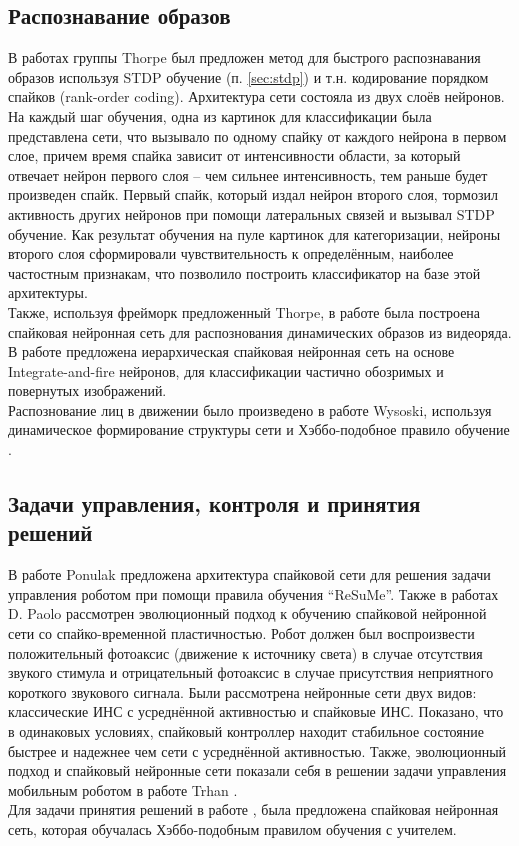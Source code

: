\documentclass[a4paper,10pt]{article}
\begin{document}
\subsection{Распознавание образов}
\indent В работах группы Thorpe \cite{thorpe2001spike,guyonneau2004temporal,perrinet2004sparse} был предложен метод для быстрого распознавания образов используя STDP обучение (п. \ref{sec:stdp}) и т.н. кодирование порядком спайков (rank-order coding). Архитектура сети состояла из двух слоёв нейронов. На каждый шаг обучения, одна из картинок для классификации была представлена сети, что вызывало по одному спайку от каждого нейрона в первом слое, причем время спайка зависит от интенсивности области, за который отвечает нейрон первого слоя -- чем сильнее интенсивность, тем раньше будет произведен спайк. Первый спайк, который издал нейрон второго слоя, тормозил активность других нейронов при помощи латеральных связей и вызывал STDP обучение. Как результат обучения на пуле картинок для категоризации, нейроны второго слоя сформировали чувствительность к определённым, наиболее частостным признакам, что позволило построить классификатор на базе этой архитектуры.\\
\indent Также, используя фрейморк предложенный Thorpe, в работе \cite{kornprobst2005could} была построена спайковая нейронная сеть для распознования динамических образов из видеоряда. В работе \cite{shin2010recognition} предложена иерархическая спайковая нейронная сеть на основе Integrate-and-fire нейронов, для классификации частично обозримых и повернутых изображений.\\
\indent Распознование лиц в движении было произведено в работе Wysoski, используя динамическое формирование структуры сети и Хэббо-подобное правило обучение \cite{wysoski2008fast}.
\subsection{Задачи управления, контроля и принятия решений}
\indent В работе Ponulak \cite{ponulak2006resume} предложена архитектура спайковой сети для решения задачи управления роботом при помощи правила обучения ``ReSuMe''. Также в работах D. Paolo \cite{paolo2003a, paolo2003b} рассмотрен эволюционный подход к обучению спайковой нейронной сети со спайко-временной пластичностью. Робот должен был воспроизвести положительный фотоаксис (движение к источнику света) в случае отсутствия звукого стимула и отрицательный фотоаксис в случае присутствия неприятного короткого звукового сигнала. Были рассмотрена нейронные сети двух видов: классические ИНС с усреднённой активностью и спайковые ИНС. Показано, что в одинаковых условиях, спайковый контроллер находит стабильное состояние быстрее и надежнее чем сети с усреднённой активностью. Также, эволюционный подход и спайковый нейронные сети показали себя в решении задачи управления мобильным роботом в работе Trhan \cite{trhan2012application}.\\
\indent Для задачи принятия решений в работе \cite{glackin2008implementing}, была предложена спайковая нейронная сеть, которая обучалась Хэббо-подобным правилом обучения с учителем. 
\end{document}
